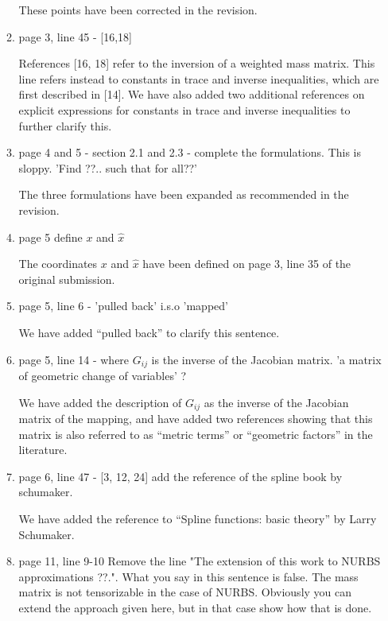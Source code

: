 \documentclass[10pt]{article}
\newcommand{\note}[1]{{\color{violet}#1}}
\begin{document}
\begin{enumerate}
\begin{enumerate}
\note{These points have been corrected in the revision.}

\item page 3, line 45 -                [16,18]

\note{References [16, 18] refer to the inversion of a weighted mass matrix.  This line refers instead to constants in trace and inverse inequalities, which are first described in [14].  We have also added two additional references on explicit expressions for constants in trace and inverse inequalities to further clarify this.  }

\item page 4 and 5 -                  section 2.1 and 2.3 - complete the formulations. This is sloppy. 'Find ??.. such that for all??'

\note{The three formulations have been expanded as recommended in the revision.}

\item page 5                               define $x$ and $\hat{x}$

\note{The coordinates $x$ and $\hat{x}$ have been defined on page 3, line 35 of the original submission.}

\item page 5, line 6 -                  'pulled back' i.s.o 'mapped'

\note{We have added ``pulled back'' to clarify this sentence. }

\item page 5, line 14 -                where $G_{ij}$ is the inverse of the Jacobian matrix. 'a matrix of geometric change of variables' ?

\note{We have added the description of $G_{ij}$ as the inverse of the Jacobian matrix of the mapping, and have added two references showing that this matrix is also referred to as ``metric terms'' or ``geometric factors'' in the literature.}

\item page 6, line 47 -               [3, 12, 24] add the reference of the spline book by schumaker.

\note{We have added the reference to ``Spline functions: basic theory'' by Larry Schumaker.}

\item page 11, line 9-10             Remove the line "The extension of this work to NURBS approximations ??.". What you say in this sentence                                            is false. The mass matrix is not tensorizable in the case of NURBS. Obviously you can extend the approach given here, but in that case show how that is done.


\end{enumerate}
\end{enumerate}
\end{document}
